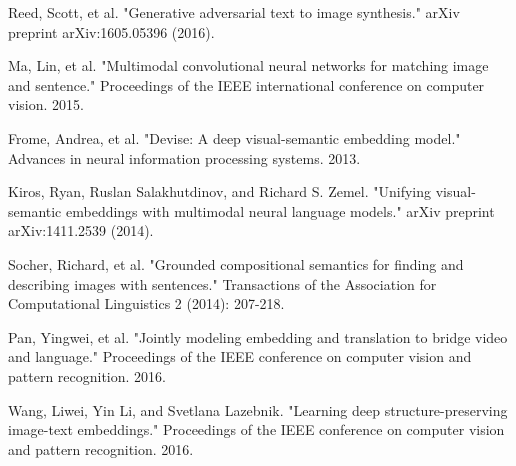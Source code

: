 \documentclass[runningheads]{llncs}
\begin{document}
\begin{thebibliography}{8}
Reed, Scott, et al. "Generative adversarial text to image synthesis." arXiv preprint arXiv:1605.05396 (2016).

Ma, Lin, et al. "Multimodal convolutional neural networks for matching image and sentence." Proceedings of the IEEE international conference on computer vision. 2015.

Frome, Andrea, et al. "Devise: A deep visual-semantic embedding model." Advances in neural information processing systems. 2013.

Kiros, Ryan, Ruslan Salakhutdinov, and Richard S. Zemel. "Unifying visual-semantic embeddings with multimodal neural language models." arXiv preprint arXiv:1411.2539 (2014).

Socher, Richard, et al. "Grounded compositional semantics for finding and describing images with sentences." Transactions of the Association for Computational Linguistics 2 (2014): 207-218.

Pan, Yingwei, et al. "Jointly modeling embedding and translation to bridge video and language." Proceedings of the IEEE conference on computer vision and pattern recognition. 2016.

Wang, Liwei, Yin Li, and Svetlana Lazebnik. "Learning deep structure-preserving image-text embeddings." Proceedings of the IEEE conference on computer vision and pattern recognition. 2016.

\end{thebibliography}
\end{document}
